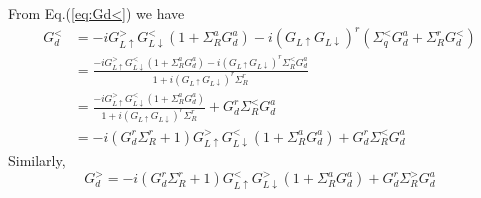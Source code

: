 From Eq.(\ref{eq:Gd<}) we have
\begin{equation}
\begin{split}
G_{d}^{<}&=-i G_{L \uparrow}^{>} G_{L \downarrow}^{<}\left(1+\Sigma_{R}^{a} G_{d}^{a}\right)-i\left(G_{L \uparrow} G_{L \downarrow}\right)^{r}\left(\Sigma_{q}^{<} G_{d}^{a}+\Sigma_{R}^{r} G_{d}^{<}\right)\\
&=\frac{-i G_{L \uparrow}^{>} G_{L \downarrow}^{<}\left(1+\Sigma_{R}^{a} G_{d}^{a}\right) - i\left(G_{L \uparrow} G_{L \downarrow}\right)^{r}\Sigma_{R}^{<} G_{d}^{a}}{1+i\left(G_{L \uparrow} G_{L \downarrow}\right)^{r}\Sigma_{R}^{r}} \\
&=\frac{-i G_{L \uparrow}^{>} G_{L \downarrow}^{<}\left(1+\Sigma_{R}^{a} G_{d}^{a}\right)}{1+i\left(G_{L \uparrow} G_{L \downarrow}\right)^{r}\Sigma_{R}^{r}} + G_{d}^{r}\Sigma_{R}^{<} G_{d}^{a}\\
&=-i(G_{d}^{r}\Sigma_{R}^{r}+1) G_{L \uparrow}^{>} G_{L \downarrow}^{<}\left(1+\Sigma_{R}^{a} G_{d}^{a}\right) + G_{d}^{r}\Sigma_{R}^{<} G_{d}^{a}
\end{split}
\end{equation}
Similarly,
\begin{equation}
G_{d}^{>}=-i\left(G_{d}^{r} \Sigma_{R}^{r}+1\right) G_{L \uparrow}^{<} G_{L \downarrow}^{>}\left(1+\Sigma_{R}^{a} G_{d}^{a}\right)+G_{d}^{r} \Sigma_{R}^{>} G_{d}^{a}
\end{equation}

